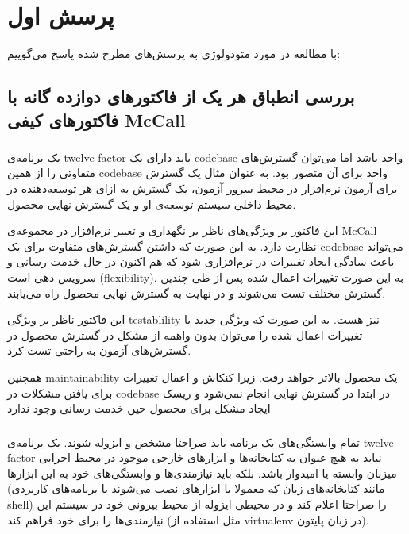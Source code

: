 
\section{پرسش اول}
با مطالعه در مورد متودولوژی 
به پرسش‌های مطرح شده پاسخ می‌گوییم:

\subsection{بررسی انطباق هر یک از فاکتور‌های دوازده گانه با فاکتور‌های کیفی ‌McCall}
\subsubsection{}
یک برنامه‌ی 
twelve-factor
باید دارای یک codebase واحد باشد اما می‌توان گسترش‌های متفاوتی را از همین codebase واحد برای آن متصور بود. به عنوان مثال یک گسترش برای آزمون نرم‌افزار در محیط سرور آزمون، یک گسترش به ازای هر توسعه‌دهنده در محیط داخلی سیستم توسعه‌ی او و یک گسترش نهایی  محصول.

این فاکتور بر ویژگی‌های  ناظر بر نگهداری و تغییر نرم‌افزار در مجموعه‌ی McCall نظارت دارد. به این صورت که داشتن گسترش‌های متفاوت برای یک codebase می‌تواند باعث سادگی ایجاد تغییرات در نرم‌افزاری شود که هم اکنون در حال خدمت رسانی و سرویس دهی است (flexibility). به این صورت تغییرات اعمال شده پس از طی چندین گسترش مختلف تست می‌شوند و در نهایت به گسترش نهایی محصول راه می‌یابند.

این فاکتور ناظر بر ویژگی testablility نیز هست. به این صورت که ویژگی جدید یا تغییرات اعمال شده را می‌توان بدون واهمه از مشکل در گسترش محصول در گسترش‌های آزمون به راحتی تست کرد.

همچنین maintainability یک محصول بالاتر خواهد رفت. زیرا کنکاش و اعمال تغییرات برای یافتن مشکلات در codebase در ابتدا در گسترش نهایی انجام نمی‌شود و ریسک ایجاد مشکل برای محصول حین خدمت رسانی وجود ندارد




\subsubsection{}
تمام وابستگی‌های یک برنامه باید صراحتا مشخص و ایزوله شوند.
یک برنامه‌ی
twelve-factor
نباید به هیچ عنوان به کتابخانه‌ها و ابزار‌های خارجی موجود در محیط اجرایی میزبان وابسته یا امیدوار باشد. بلکه باید نیازمندی‌ها و وابستگی‌های خود به این ابزار‌ها (مانند کتابخانه‌های زبان که معمولا با ابزار‌های   نصب می‌شوند یا برنامه‌های کاربردی shell) را صراحتا اعلام کند و در محیطی ایزوله از محیط بیرونی خود در سیستم این  نیازمندی‌ها را برای خود فراهم کند (مثل استفاده از virtualenv در زبان پایتون).

